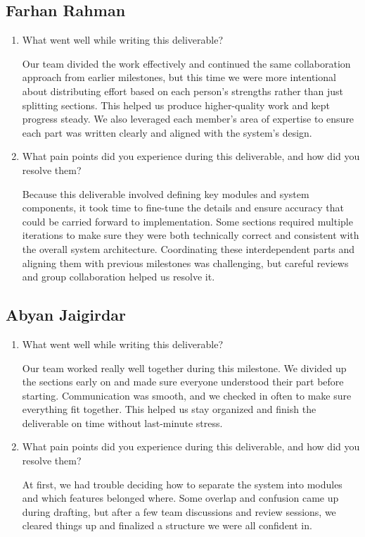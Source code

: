 \documentclass[12pt, titlepage]{article}
\begin{document}
\subsection{Farhan Rahman}

\begin{enumerate}
    \item What went well while writing this deliverable? 

    Our team divided the work effectively and continued the same collaboration approach from earlier milestones, but this time we were more intentional about distributing effort based on each person’s strengths rather than just splitting sections. This helped us produce higher-quality work and kept progress steady. We also leveraged each member’s area of expertise to ensure each part was written clearly and aligned with the system’s design. 

    \item What pain points did you experience during this deliverable, and how
    did you resolve them?

    Because this deliverable involved defining key modules and system components, it took time to fine-tune the details and ensure accuracy that could be carried forward to implementation. Some sections required multiple iterations to make sure they were both technically correct and consistent with the overall system architecture. Coordinating these interdependent parts and aligning them with previous milestones was challenging, but careful reviews and group collaboration helped us resolve it.

\end{enumerate}

\subsection{Abyan Jaigirdar}

\begin{enumerate}
    \item What went well while writing this deliverable? 

    Our team worked really well together during this milestone. We divided up the sections early on and made sure everyone understood their part before starting. Communication was smooth, and we checked in often to make sure everything fit together. This helped us stay organized and finish the deliverable on time without last-minute stress.

    \item What pain points did you experience during this deliverable, and how
    did you resolve them?

    At first, we had trouble deciding how to separate the system into modules and which features belonged where. Some overlap and confusion came up during drafting, but after a few team discussions and review sessions, we cleared things up and finalized a structure we were all confident in.

\end{enumerate}
\end{document}
